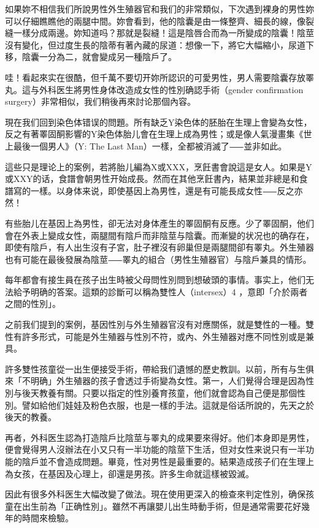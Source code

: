 \documentclass[12pt,UTF8]{ctexbook}
\begin{document}
如果妳不相信我们所說男性外生殖器官和我们的非常類似，下次遇到裸身的男性妳可以仔細瞧瞧他的兩腿中間。妳會看到，他的陰囊是由一條整齊、細長的線，像裂縫一樣分成兩邊。妳知道吗？那就是裂縫！這是陰唇合而為一所變成的陰囊！陰莖沒有變化，但过度生長的陰蒂有著內藏的尿道：想像一下，將它大幅縮小，尿道下移，陰囊一分為二，就會變成另一種陰戶了。

哇！看起來实在很酷，但千萬不要切开妳所認识的可愛男性，男人需要陰囊存放睪丸。這与外科医生將男性身体改造成女性的性別确認手術（gender confirmation surgery）非常相似，我们稍後再來討论那個內容。

現在我们回到染色体错误的問題。所有缺乏Y染色体的胚胎在生理上會變為女性，反之有著睪固酮影響的Y染色体胎儿會在生理上成為男性；或是像人氣漫畫集《世上最後一個男人》（Y: The Last Man）一樣，全都被消滅了⸺並非如此。

這些只是理论上的案例，若將胎儿編為X或XXX，烹飪書會說這是女人。如果是Y或XXY的话，食譜會朝男性开始成長。然而在其他烹飪書內，結果並非總是和食譜寫的一樣。以身体来说，即使基因上為男性，還是有可能長成女性⸺反之亦然！

有些胎儿在基因上為男性，卻无法对身体產生的睪固酮有反應。少了睪固酮，他们會在外表上變成女性，兩腿間有陰戶而非陰莖与陰囊。而漸變的状况也的确存在，即使有陰戶，有人出生沒有子宮，肚子裡沒有卵巢但是兩腿間卻有睪丸。外生殖器也有可能在最後發展為陰莖⸺睪丸的組合（男性生殖器官）与陰戶兼具的情形。

每年都會有接生員在孩子出生時被父母問性別問到想破頭的事情。事实上，他们无法給予明确的答案。這類的診斷可以稱為雙性人（intersex）4 ，意即「介於兩者之間的性別」。

之前我们提到的案例，基因性別与外生殖器官沒有对應關係，就是雙性的一種。雙性有許多形式，可能是外生殖器与性別不符，或內、外生殖器对應不同性別或是兼具。

許多雙性孩童從一出生便接受手術，帶給我们遺憾的歷史教訓。以前，所有与生俱來「不明确」外生殖器的孩子會透过手術變為女性。第一，人们覺得合理是因為性別与後天教養有關。只要以指定的性別養育孩童，他们就會認為自己便是那個性別。譬如給他们娃娃及粉色衣服，也是一樣的手法。這就是俗话所說的，先天之於後天的教養。

再者，外科医生認為打造陰戶比陰莖与睪丸的成果要來得好。他们本身即是男性，便會覺得男人沒辦法在小又只有一半功能的陰莖下生活，但对女性来说只有一半功能的陰戶並不會造成問題。畢竟，性对男性是最重要的。結果造成孩子们在生理上為女孩，在基因及心理上，卻還是男孩。許多生命就這樣被毀滅。

因此有很多外科医生大幅改變了做法。現在使用更深入的檢查來判定性別，确保孩童在出生前為「正确性別」。雖然不再讓嬰儿出生時動手術，但是通常需要花好幾年的時間來檢驗。
\end{document}
